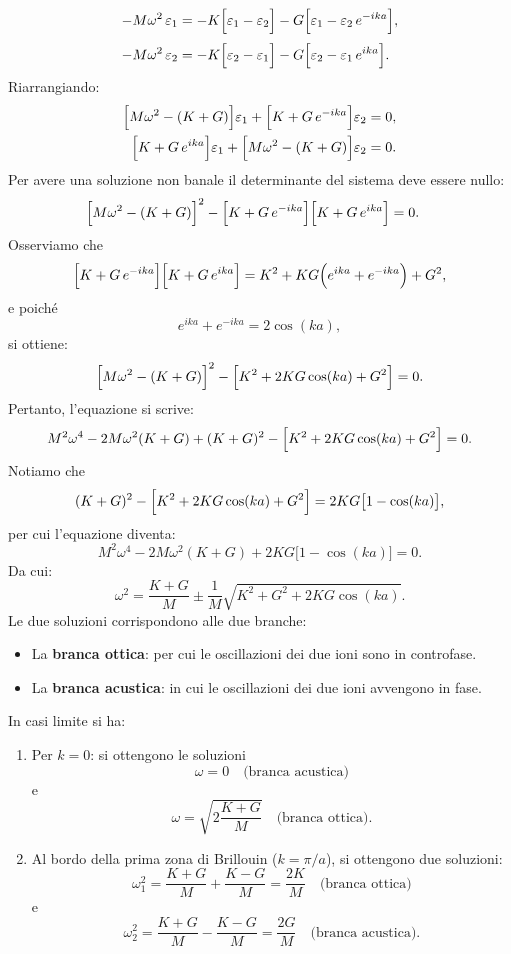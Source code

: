 \begin{align}
    -M\omega^2\,\varepsilon_1 &= -K\Bigl[\varepsilon_1 - \varepsilon_2\Bigr] - G\Bigl[\varepsilon_1 - \varepsilon_2\,e^{-ika}\Bigr],\\[1mm]
    -M\omega^2\,\varepsilon_2 &= -K\Bigl[\varepsilon_2 - \varepsilon_1\Bigr] - G\Bigl[\varepsilon_2 - \varepsilon_1\,e^{ika}\Bigr].
\end{align}
Riarrangiando:
\begin{align}
    \Bigl[M\omega^2 - (K+G)\Bigr]\varepsilon_1 + \Bigl[K + G\,e^{-ika}\Bigr]\varepsilon_2 &= 0, \\
    \Bigl[K + G\,e^{ika}\Bigr]\varepsilon_1 + \Bigl[M\omega^2 - (K+G)\Bigr]\varepsilon_2 &= 0.
\end{align}
Per avere una soluzione non banale il determinante del sistema deve essere nullo:
\begin{equation}
\begin{split}
    \Bigl[M\omega^2 - (K+G)\Bigr]^2 &- \Bigl[K + G\,e^{-ika}\Bigr]\Bigl[K + G\,e^{ika}\Bigr] = 0.
\end{split}
\end{equation}
Osserviamo che
\[
\Bigl[K + G\,e^{-ika}\Bigr]\Bigl[K + G\,e^{ika}\Bigr] = K^2 + KG\Bigl(e^{ika}+e^{-ika}\Bigr) + G^2,
\]
e poiché
\[
e^{ika}+e^{-ika} = 2\cos(ka),
\]
si ottiene:
\[
\Bigl[M\omega^2 - (K+G)\Bigr]^2 - \Bigl[K^2 + 2KG\cos(ka) + G^2\Bigr] = 0.
\]
Pertanto, l'equazione si scrive:
\[
M^2\omega^4 - 2M\omega^2(K+G) + (K+G)^2 - \Bigl[K^2 + 2KG\cos(ka) + G^2\Bigr] = 0.
\]
Notiamo che
\[
(K+G)^2 - \Bigl[K^2 + 2KG\cos(ka) + G^2\Bigr] = 2KG\bigl[1-\cos(ka)\bigr],
\]
per cui l'equazione diventa:
\[
M^2\omega^4 - 2M\omega^2(K+G) + 2KG\bigl[1-\cos(ka)\bigr] = 0.
\]
Da cui:
\[
\omega^2 = \frac{K+G}{M} \pm \frac{1}{M}\sqrt{K^2 + G^2 + 2KG\cos(ka)}.
\]
Le due soluzioni corrispondono alle due branche:
\begin{itemize}
    \item La \textbf{branca ottica}: per cui le oscillazioni dei due ioni sono in controfase.
    \item La \textbf{branca acustica}: in cui le oscillazioni dei due ioni avvengono in fase.
\end{itemize}
In casi limite si ha:
\begin{enumerate}
    \item Per \(k=0\): si ottengono le soluzioni
    \[
    \omega = 0 \quad \text{(branca acustica)}
    \]
    e
    \[
    \omega = \sqrt{2\frac{K+G}{M}} \quad \text{(branca ottica).}
    \]
    \item Al bordo della prima zona di Brillouin (\(k = \pi/a\)), si ottengono due soluzioni:
    \[
    \omega_1^2 = \frac{K+G}{M} + \frac{K-G}{M} = \frac{2K}{M} \quad \text{(branca ottica)}
    \]
    e
    \[
    \omega_2^2 = \frac{K+G}{M} - \frac{K-G}{M} = \frac{2G}{M} \quad \text{(branca acustica).}
    \]
\end{enumerate}
